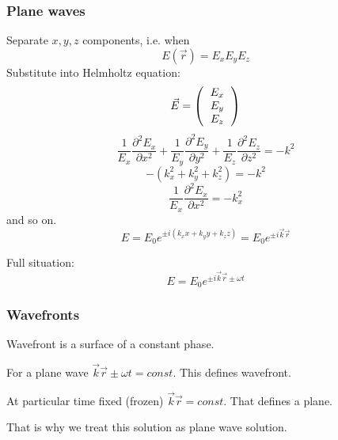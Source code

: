 \documentclass[10pt]{article}
\begin{document}
\subsubsection{Plane waves}
Separate $x,y,z$ components, i.e. when
\begin{equation*}
E(\vec{r}) = E_xE_yE_z
\end{equation*}
Substitute into Helmholtz equation:
\begin{equation*}
\vec{E} = \left(
\begin{tabular}{c}
$E_x$ \\
$E_y$ \\
$E_z$ \\
\end{tabular} \right)
\end{equation*}
\begin{equation*}
\frac{1}{E_x} \frac{\partial^2 E_x}{\partial x^2} + \frac{1}{E_y} \frac{\partial^2 E_y}{\partial y^2}  + \frac{1}{E_z} \frac{\partial^2 E_z}{\partial z^2}= -k^2
\end{equation*}
\begin{equation*}
-(k_x ^2 + k_y ^ 2 + k_z ^2) = -k^2
\end{equation*}
\begin{equation*}
\frac{1}{E_x} \frac{\partial^2 E_x}{\partial x^2} = -k_x ^2
\end{equation*}
and so on.
\begin{equation*}
E = E_0 e^{\pm i(k_x x + k_y y + k_z z)} = E_0 e^{\pm i\vec{k} \vec{r}}
\end{equation*}

Full situation:
\begin{equation}\boxed{
E = E_0 e^{\pm i\vec{k} \vec{r} \pm \omega t}
}\end{equation}

\subsubsection{Wavefronts}
Wavefront is a surface of a constant phase.

For a plane wave $\vec{k}\vec{r} \pm \omega t = const$. This defines wavefront.

At particular time fixed (frozen) $\vec{k} \vec{r} = const$. That defines a plane.

That is why we treat this solution as plane wave solution.
\end{document}
